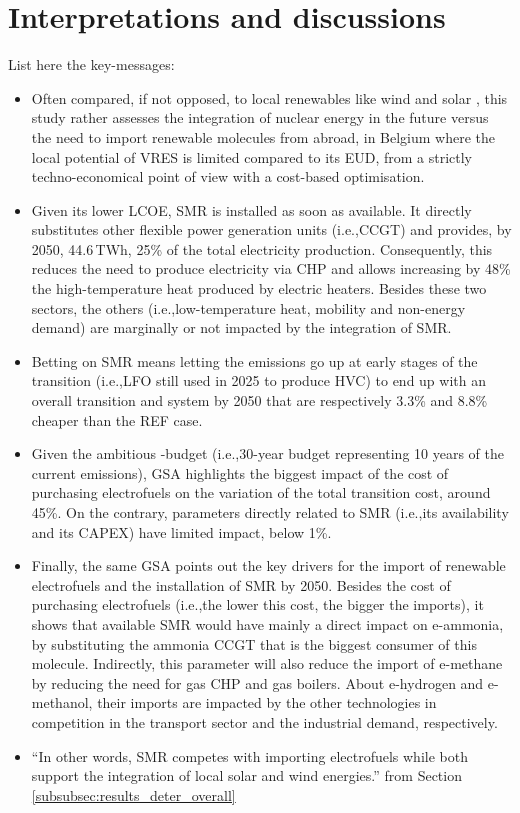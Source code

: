 \documentclass[11pt,twoside,a4paper,english]{article}
\def\ie{i.e.,}
\begin{document}
\newpage
\section{Interpretations and discussions}
\label{sec:discussions}
List here the key-messages:
\begin{itemize}
\setlength\itemsep{1em}
	\item Often compared, if not opposed, to local renewables like wind and solar \cite{suna2016nuclear,khatib2016economics}, this study rather assesses the integration of nuclear energy in the future versus the need to import renewable molecules from abroad, in Belgium where the local potential of \gls{VRES} is limited compared to its \gls{EUD}, from a strictly techno-economical point of view with a cost-based optimisation. 
    \item Given its lower \gls{LCOE}, \gls{SMR} is installed as soon as available. It directly substitutes other flexible power generation units (\ie CCGT) and provides, by 2050, 44.6\,TWh, 25\% of the total electricity production. Consequently, this  reduces the need to produce electricity via \gls{CHP} and allows increasing by 48\% the high-temperature heat produced by electric heaters. Besides these two sectors, the others (\ie low-temperature heat, mobility and non-energy demand) are marginally or not impacted by the integration of \gls{SMR}.
    \item Betting on \gls{SMR} means letting the emissions go up at early stages of the transition (\ie \gls{LFO} still used in 2025 to produce \gls{HVC}) to end up with an overall transition and system by 2050 that are respectively 3.3\% and 8.8\% cheaper than the REF case. 
    \item Given the ambitious -budget (\ie 30-year budget representing 10 years of the current emissions), \acrfull{GSA} highlights the biggest impact of the cost of purchasing electrofuels on the variation of the total transition cost, around 45\%. On the contrary, parameters directly related to \gls{SMR} (\ie its availability and its CAPEX) have limited impact, below 1\%.
    \item Finally, the same \gls{GSA} points out the key drivers for the import of renewable electrofuels and the installation of \gls{SMR} by 2050. Besides the cost of purchasing electrofuels (\ie the lower this cost, the bigger the imports), it shows that available \gls{SMR} would have mainly a direct impact on e-ammonia, by substituting the ammonia \gls{CCGT} that is the biggest consumer of this molecule. Indirectly, this parameter will also reduce the import of e-methane by reducing the need for gas \gls{CHP} and gas boilers. About e-hydrogen and e-methanol, their imports are impacted by the other technologies in competition in the transport sector and the industrial demand, respectively.
    \item ``In other words, \gls{SMR} competes with importing electrofuels while both support the integration of local solar and wind energies.'' from Section \ref{subsubsec:results_deter_overall}
\end{itemize}
\end{document}
